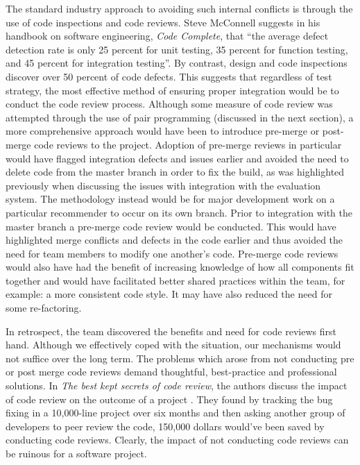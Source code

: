 \documentclass{l3proj}
\begin{document}
The standard industry approach to avoiding such internal conflicts is through the use of code inspections and code reviews. Steve McConnell suggests in his handbook on software engineering, \textit{Code Complete}, that ``the average defect detection rate is only 25 percent for unit testing, 35 percent for function testing, and 45 percent for integration testing''\cite{CodeComplete}. By contrast, design and code inspections discover over 50 percent of code defects. This suggests that regardless of test strategy, the most effective method of ensuring proper integration would be to conduct the code review process. Although some measure of code review was attempted through the use of pair programming (discussed in the next section), a more comprehensive approach would have been to introduce pre-merge or post-merge code reviews to the project. Adoption of pre-merge reviews in particular would have flagged integration defects and issues earlier and avoided the need to delete code from the master branch in order to fix the build, as was highlighted previously when discussing the issues with integration with the evaluation system. The methodology instead would be for major development work on a particular recommender to occur on its own branch. Prior to integration with the master branch a pre-merge code review would be conducted. This would have highlighted merge conflicts and defects in the code earlier and thus avoided the need for team members to modify one another's code. Pre-merge code reviews would also have had the benefit of increasing knowledge of how all components fit together and would have facilitated better shared practices within the team, for example: a more consistent code style. It may have also reduced the need for some re-factoring.

In retrospect, the team discovered the benefits and need for code reviews first hand. Although we effectively coped with the situation, our mechanisms would not suffice over the long term. The problems which arose from not conducting pre or post merge code reviews demand thoughtful, best-practice and professional solutions. In \textit{The best kept secrets of code review}, the authors discuss the impact of code review on the outcome of a project \cite{CodeReview}. They found by tracking the bug fixing in a 10,000-line project over six months and then asking another group of developers to peer review the code, 150,000 dollars would've been saved by conducting code reviews. Clearly, the impact of not conducting code reviews can be ruinous for a software project. 
\end{document}
